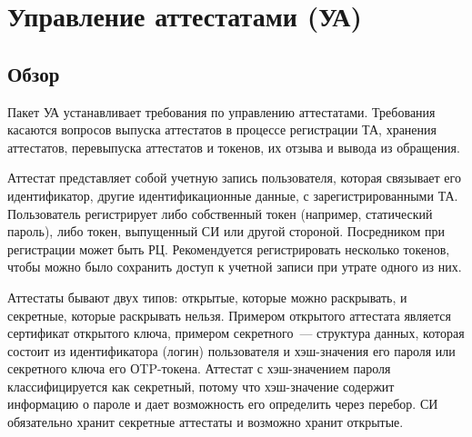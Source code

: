 \section{Управление аттестатами (УА)}\label{CM}

\subsection{Обзор}\label{CM.Intro}

Пакет УА устанавливает требования по управлению аттестатами.
Требования касаются вопросов выпуска аттестатов в процессе регистрации ТА,
хранения аттестатов, перевыпуска аттестатов и токенов, их отзыва и вывода из
обращения.

Аттестат представляет собой учетную запись пользователя, которая связывает
его идентификатор, другие идентификационные данные, с зарегистрированными ТА.
%
Пользователь регистрирует либо собственный токен (например, статический пароль), 
либо токен, выпущенный СИ или другой стороной. 
%
Посредником при регистрации может быть РЦ. Рекомендуется регистрировать 
несколько токенов, чтобы можно было сохранить доступ к учетной записи при 
утрате одного из них.


Аттестаты бывают двух типов: открытые, которые можно раскрывать, и 
секретные, которые раскрывать нельзя. 
%
Примером открытого аттестата является сертификат открытого ключа, примером 
секретного~--- структура данных, которая состоит из идентификатора 
(логин) пользователя и хэш-значения его пароля или секретного ключа его 
ОTP-токена.
%
Аттестат с хэш-значением пароля классифицируется как секретный, потому что 
хэш-значение содержит информацию о пароле и дает возможность его определить
через перебор.
%
СИ обязательно хранит секретные аттестаты и возможно хранит открытые.

%

